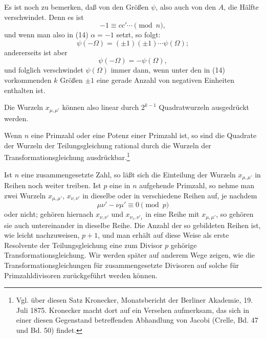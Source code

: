 \documentclass[11pt]{article}
\begin{document}
Es ist noch zu bemerken, daß von den Größen $\psi$, also auch von den $A$, die Hälfte
verschwindet. Denn es ist
\[
 -1\equiv cc'\cdots\pmod n,
\]
und wenn man also in (14) $\alpha=-1$ setzt, so folgt:
\[
 \psi(-\Omega)=(\pm1)(\pm1)\cdots\psi(\Omega);
\]
andererseits ist aber
\[
 \psi(-\Omega)=-\psi(\Omega),
\]
und folglich verschwindet $\psi(\Omega)$ immer dann, wenn unter den in (14) vorkommenden
$k$ Größen $\pm1$ eine gerade Anzahl von negativen Einheiten enthalten ist.

Die Wurzeln $x_{\mu,\mu'}$ können also linear durch $2^{k-1}$ Quadratwurzeln ausgedrückt
werden.

Wenn $n$ eine Primzahl oder eine Potenz einer Primzahl ist, so sind die Quadrate der
Wurzeln der Teilungsgleichung rational durch die Wurzeln der Transformationsgleichung
ausdrückbar.\footnote{Vgl. über diesen Satz Kronecker, Monatsbericht der Berliner Akademie, 19. Juli 1875. Kronecker macht dort auf ein Versehen aufmerksam, das sich in einer diesen Gegenstand betreffenden Abhandlung von Jacobi (Crelle, Bd. 47 und Bd. 50) findet.}

Ist $n$ eine zusammengesetzte Zahl, so läßt sich die Einteilung der Wurzeln
$x_{\mu,\mu'}$ in Reihen noch weiter treiben. Ist $p$ eine in $n$ aufgehende Primzahl, so
nehme man zwei Wurzeln $x_{\mu,\mu'}$, $x_{\nu,\nu'}$ in dieselbe oder in verschiedene Reihen
auf, je nachdem
\[
 \mu\nu'-\nu\mu'\equiv0\pmod p
\]
oder nicht; gehören hiernach $x_{\nu,\nu'}$ und $x_{\nu_1,\nu'_1}$ in eine Reihe mit
$x_{\mu,\mu'}$, so gehören sie auch untereinander in dieselbe Reihe. Die Anzahl der so
gebildeten Reihen ist, wie leicht nachzuweisen, $p+1$, und man erhält auf diese Weise als
erste Resolvente der Teilungsgleichung eine zum Divisor $p$ gehörige Transformationsgleichung.
Wir werden später auf anderem Wege zeigen, wie die Transformationsgleichungen für
zusammengesetzte Divisoren auf solche für Primzahldivisoren zurückgeführt werden können.
\end{document}
